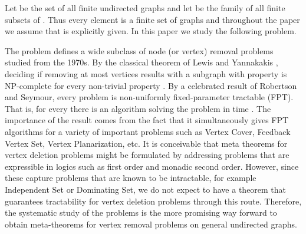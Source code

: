 

 Let  be the set of all finite undirected graphs and let  be the family of all finite subsets of  .
  Thus   every element  is a finite set of graphs and
throughout the paper we assume that   is explicitly given.   In this paper we study the following \fd{} problem. 


\smallskip

 
 


\smallskip

\noindent 
The \fd{} problem defines  a wide subclass of node (or vertex) removal problems studied from the 1970s. By the classical theorem of  Lewis and Yannakakis  \cite{LewisY80}, deciding if  removing at most  vertices results with a subgraph with property  is  NP-complete for every non-trivial property .
By a celebrated result of Robertson and Seymour, every \fd{} problem is non-uniformly  fixed-parameter tractable (FPT). 
That is, for every  there is an algorithm solving the problem  in time   \cite{RobertsonS13}.  The 
importance of the result comes from the fact that it simultaneously gives FPT algorithms for a variety of important 
problems such as {\sc Vertex Cover}, {\sc Feedback Vertex Set}, {\sc Vertex Planarization},  etc.  
It is conceivable that meta theorems for vertex deletion problems might be formulated by addressing problems that are expressible in logics such as first order and monadic second order. However, since these capture problems that are known 
to be intractable, for example {\sc Independent Set} or {\sc Dominating Set}, we do not expect to have a theorem 
that guarantees tractability for vertex deletion problems through this route. Therefore, 
the systematic study of the \fd{} problems is the more promising way forward to obtain meta-theorems 
for vertex removal problems on general undirected graphs.


